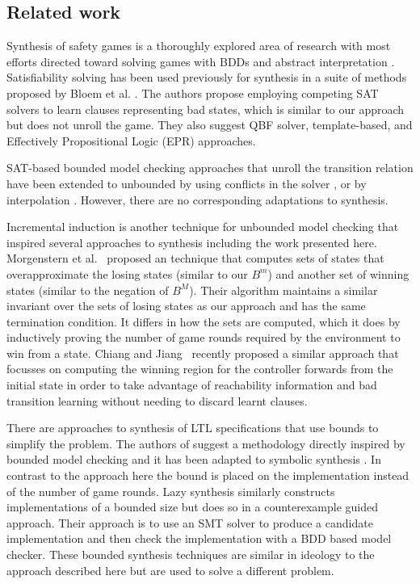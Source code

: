 \subsection{Related work}

Synthesis of safety games is a thoroughly explored area of research with most
efforts directed toward solving games with BDDs \cite{Burch90} and abstract
interpretation \cite{Walker14,Brenguier14}. Satisfiability solving has been used
previously for synthesis in a suite of methods proposed by Bloem et al.
\cite{Bloem14}. The authors propose employing competing SAT solvers to learn
clauses representing bad states, which is similar to our approach but does not
unroll the game.  They also suggest QBF solver, template-based, and Effectively
Propositional Logic (EPR) approaches.

SAT-based bounded model checking approaches that unroll the transition relation
have been extended to unbounded by using conflicts in the solver
\cite{McMillan02}, or by interpolation \cite{McMillan03}. However, there
are no corresponding adaptations to synthesis.

Incremental induction \cite{Bradley11} is another technique for unbounded
model checking that inspired several approaches to synthesis including the work
presented here.  Morgenstern et al.~\cite{Morgenstern13} proposed an
technique that computes sets of states that overapproximate the losing states
(similar to our $B^m$) and another set of winning states (similar to the
negation of $B^M$).  Their algorithm maintains a similar invariant over the
sets of losing states as our approach and has the same termination condition.
It differs in how the sets are computed, which it does by inductively proving
the number of game rounds required by the environment to win from a state.
Chiang and Jiang~\cite{Chiang15} recently proposed a similar approach that
focusses on computing the winning region for the controller forwards from the
initial state in order to take advantage of reachability information and bad
transition learning without needing to discard learnt clauses.

There are approaches to synthesis of LTL specifications that use bounds to simplify the problem.  The authors of \cite{Finkbeiner13} suggest a methodology directly inspired by bounded model checking and it has been adapted to symbolic synthesis \cite{Ehlers12}. In contrast to the approach here the bound is placed on the implementation instead of the number of game rounds.  Lazy synthesis \cite{Finkbeiner12} similarly constructs implementations of a bounded size but does so in a counterexample guided approach. Their approach is to use an SMT solver to produce a candidate implementation and then check the implementation with a BDD based model checker. These bounded synthesis techniques are similar in ideology to the approach described here but are used to solve a different problem.

